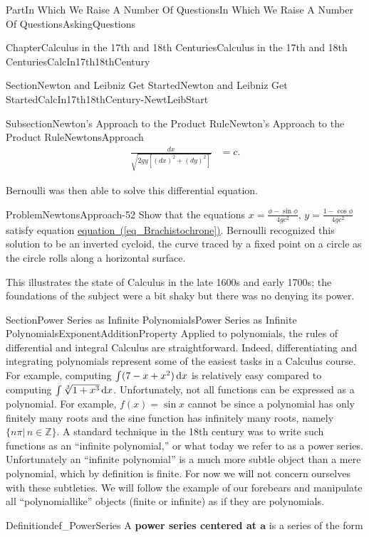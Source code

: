 \documentclass[oneside,10pt,]{book}
\newcommand{\xreffont}{\relax}
\newcommand{\terminology}[1]{\textbf{#1}}
\numberwithin{equation}{part}
\newcommand{\dx}[1]{\,{\rm d}#1}
\newcommand{\ZZ}{\mathbb {Z}}
\newcommand{\amp}{&}
\begin{document}
\begin{partptx}{Part}{In Which We Raise A Number Of Questions}{}{In Which We Raise A Number Of Questions}{}{}{AskingQuestions}
\begin{chapterptx}{Chapter}{Calculus in the 17th and 18th Centuries}{}{Calculus in the 17th and 18th Centuries}{}{}{CalcIn17th18thCentury}
\begin{sectionptx}{Section}{Newton and Leibniz Get Started}{}{Newton and Leibniz Get Started}{}{}{CalcIn17th18thCentury-NewtLeibStart}
\begin{subsectionptx}{Subsection}{Newton's Approach to the Product Rule}{}{Newton's Approach to the Product Rule}{}{}{NewtonsApproach}
\begin{align}
\frac{d x}{\sqrt{2gy\left[(d x)^2+(d y)^2\right]}} \amp = c\text{.}\label{eq_Brachistochrone}
\end{align}
%
\par
Bernoulli was then able to solve this differential equation.%
\begin{problem}{Problem}{}{NewtonsApproach-52}%
Show that the equations \(x=\frac{\phi-\sin
\phi}{4gc^2},\,y=\frac{1-\cos \phi}{4gc^2}\) satisfy equation \hyperref[eq_Brachistochrone]{equation~({\xreffont\ref{eq_Brachistochrone}})}. Bernoulli recognized this solution to be an inverted cycloid, the curve traced by a fixed point on a circle as the circle rolls along a horizontal surface.%
\end{problem}
This illustrates the state of Calculus in the late 1600s and early 1700s; the foundations of the subject were a bit shaky but there was no denying its power.%
\end{subsectionptx}
\end{sectionptx}
%
%
\typeout{************************************************}
\typeout{************************************************}
%
\begin{sectionptx}{Section}{Power Series as Infinite Polynomials}{}{Power Series as Infinite Polynomials}{}{}{ExponentAdditionProperty}
 Applied to polynomials, the rules of differential and integral Calculus are straightforward.  Indeed, differentiating and integrating polynomials represent some of the easiest tasks in a Calculus course.  For example, computing \(\int(7-x+x^2)\dx{
x}\) is relatively easy compared to computing \(\int\sqrt[3]{1+x^3}\dx{ x}\).  Unfortunately, not all functions can be expressed as a polynomial.  For example, \(f(x)=\sin x\) cannot be since a polynomial has only finitely many roots and the sine function has infinitely many roots, namely \(\{n\pi|\,n\in\ZZ\}\).  A standard technique in the 18th century was to write such functions as an ``infinite polynomial,'' or what today we refer to as a power series.  Unfortunately an ``infinite polynomial'' is a much more subtle object than a mere polynomial, which by definition is finite.  For now we will not concern ourselves with these subtleties.  We will follow the example of our forebears and manipulate all ``polynomial\textendash{}like'' objects (finite or infinite) as if they are polynomials.%
\begin{definition}{Definition}{}{def_PowerSeries}%
%
A \terminology{power series centered at \(\boldsymbol{a}\)} is a series of the form%

\end{definition}
\end{sectionptx}
\end{chapterptx}
\end{partptx}
\end{document}
